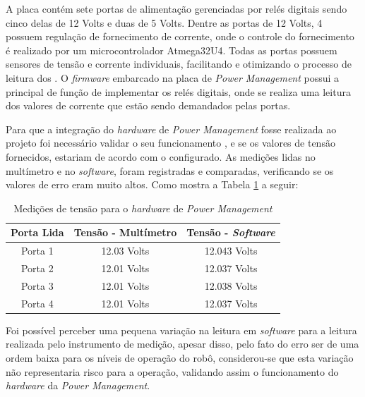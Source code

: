 A placa contém sete portas de alimentação gerenciadas por relés digitais sendo cinco delas de 12 Volts e duas de 5 Volts. Dentre as portas de 12 Volts, 4 possuem regulação de fornecimento de corrente, onde o controle do fornecimento é realizado por um microcontrolador Atmega32U4. Todas as portas possuem sensores de tensão e corrente individuais, facilitando e otimizando o processo de leitura dos . O \textit{firmware} embarcado na placa de \textit{Power Management} possui a principal de função de implementar os relés digitais, onde se realiza uma leitura dos valores de corrente que estão sendo demandados pelas portas. 

Para que a integração do \textit{hardware} de \textit{Power Management} fosse realizada ao projeto foi necessário validar o seu funcionamento , e se os valores de tensão fornecidos, estariam de acordo com o configurado. As medições lidas no multímetro e no \textit{software}, foram registradas e comparadas, verificando se os valores de erro eram muito altos. Como mostra a Tabela \ref{tab:med_pow} a seguir:

\begin{table}[H]
	\centering
	\caption{Medições de tensão para o \textit{hardware} de \textit{Power Management}}
	\label{tab:med_pow}
	\begin{tabular}{ccc}	
		\hline
		\multicolumn{1}{r}{Porta Lida}      & Tensão - Multímetro         & Tensão - \textit{Software}         \\ \hline
		Porta 1                                            & 12.03 Volts          & 12.043 Volts     \\ \hline
		Porta 2                                           & 12.01 Volts     & 12.037 Volts          \\ \hline
		Porta 3                                           & 12.01 Volts     & 12.038 Volts          \\ \hline
		Porta 4                                           & 12.01 Volts     & 12.037 Volts          \\ \hline
	\end{tabular}
\end{table}
Foi possível perceber uma pequena variação na leitura em \textit{software} para a leitura realizada pelo instrumento de medição, apesar disso, pelo fato do erro ser de uma ordem baixa para os níveis de operação do robô, considerou-se que esta variação não representaria risco para a operação, validando assim o funcionamento do \textit{hardware} da \textit{Power Management}.


